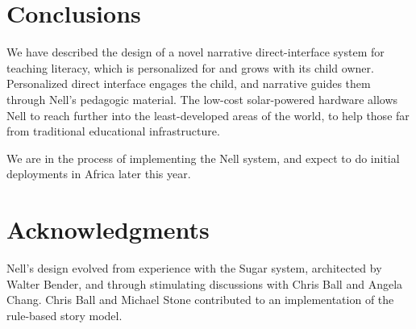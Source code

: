\documentclass{acm_proc_article-sp}
\begin{document}
\section{Conclusions}
We have described the design of a novel narrative direct-interface
system for teaching literacy, which is personalized for and grows with
its child owner.  Personalized direct interface engages the child, and
narrative guides them through Nell's pedagogic material.  The low-cost
solar-powered hardware allows Nell to reach further into the
least-developed areas of the world, to help those far from traditional
educational infrastructure.

We are in the process of implementing the Nell system, and expect to
do initial deployments in Africa later this year.

\section{Acknowledgments}
Nell's design evolved from experience with the Sugar system,
architected by Walter Bender, and through stimulating discussions with
Chris Ball and Angela Chang.  Chris Ball and Michael Stone contributed
to an implementation of the rule-based story model.

%

%
%
\balancecolumns
\end{document}
